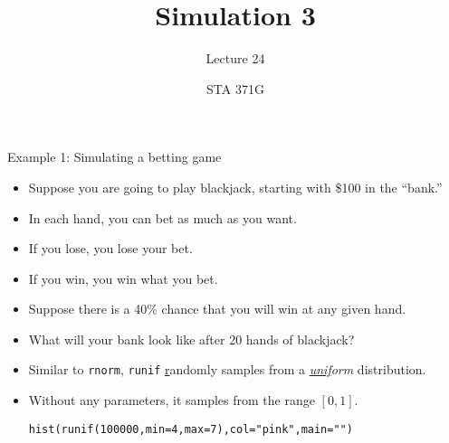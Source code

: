 \documentclass{beamer}\usepackage[]{graphicx}\usepackage[]{color}
\title{Simulation 3}
\subtitle{Lecture 24}
\author{STA 371G}
\makeatletter
\newcommand{\hlnum}[1]{\textcolor[rgb]{0.824,0.412,0.118}{#1}}%
\newcommand{\hlstr}[1]{\textcolor[rgb]{1,0.894,0.71}{#1}}%
\newcommand{\hlstd}[1]{\textcolor[rgb]{1,0.894,0.769}{#1}}%
\newcommand{\hlkwc}[1]{\textcolor[rgb]{0.78,0.941,0.545}{#1}}%
\newcommand{\hlkwd}[1]{\textcolor[rgb]{1,0.78,0.769}{#1}}%
\newenvironment{kframe}{%
 \def\at@end@of@kframe{}%
 \ifinner\ifhmode%
  \def\at@end@of@kframe{\end{minipage}}%
  \begin{minipage}{\columnwidth}%
 \fi\fi%
 \def\FrameCommand##1{\hskip\@totalleftmargin \hskip-\fboxsep
 \colorbox{shadecolor}{##1}\hskip-\fboxsep
     \hskip-\linewidth \hskip-\@totalleftmargin \hskip\columnwidth}%
 \MakeFramed {\advance\hsize-\width
   \@totalleftmargin\z@ \linewidth\hsize
   \@setminipage}}%
 {\par\unskip\endMakeFramed%
 \at@end@of@kframe}
\newenvironment{knitrout}{}{} %
\makeatother
\begin{document}
  
  

  \frame{\maketitle}



  \begin{darkframes}
    \begin{frame}{Example 1: Simulating a betting game}
      \begin{itemize}[<+->]
        \item Suppose you are going to play blackjack, starting with \$100 in the ``bank.''
        \item In each hand, you can bet as much as you want.
        \item If you lose, you lose your bet.
        \item If you win, you win what you bet.
        \item Suppose there is a 40\% chance that you will win at any given hand.
        \item What will your bank look like after 20 hands of blackjack?
      \end{itemize}
    \end{frame}

    \begin{frame}[fragile]
      \begin{itemize}[<+->]
        \item Similar to \texttt{rnorm}, \texttt{runif} \underline{r}andomly samples from a \emph{\underline{unif}orm} distribution.
        \item Without any parameters, it samples from the range $[0,1]$.
\begin{knitrout}
\begin{kframe}
\begin{alltt}
\hlkwd{hist}\hlstd{(}\hlkwd{runif}\hlstd{(}\hlnum{100000}\hlstd{,} \hlkwc{min}\hlstd{=}\hlnum{4}\hlstd{,} \hlkwc{max}\hlstd{=}\hlnum{7}\hlstd{),} \hlkwc{col}\hlstd{=}\hlstr{"pink"}\hlstd{,} \hlkwc{main}\hlstd{=}\hlstr{""}\hlstd{)}
\end{alltt}
\end{kframe}



\end{knitrout}
\end{itemize}
\end{frame}
\end{darkframes}
\end{document}
